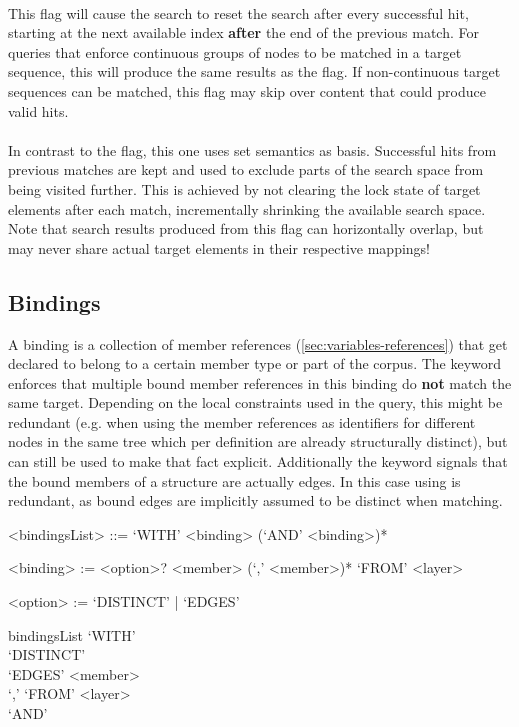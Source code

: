 \documentclass[11pt,a4paper]{report}
\begin{document}
\paragraph{}
This flag will cause the search to reset the search after every successful hit, starting at the next available index \textbf{after} the end of the previous match.
For queries that enforce continuous groups of nodes to be matched in a target sequence, this will produce the same results as the  flag.
If non-continuous target sequences can be matched, this flag may skip over content that could produce valid hits.
\paragraph{}
In contrast to the  flag, this one uses set semantics as basis.
Successful hits from previous matches are kept and used to exclude parts of the search space from being visited further.
This is achieved by not clearing the lock state of target elements after each match, incrementally shrinking the available search space.
Note that search results produced from this flag can horizontally overlap, but may never share actual target elements in their respective mappings!

\subsection{Bindings}
\label{sec:bindings}
A binding is a collection of member references (\ref{sec:variables-references}) that get declared to belong to a certain member type or part of the corpus. 
The  keyword enforces that multiple bound member references in this binding do \textbf{not} match the same target. 
Depending on the local constraints used in the query, this might be redundant (e.g. when using the member references as identifiers for different nodes in the same tree which per definition are already structurally distinct), but can still be used to make that fact explicit. 
Additionally the  keyword signals that the bound members of a structure are actually edges.
In this case using  is redundant, as bound edges are implicitly assumed to be distinct when matching.

\begin{gram}[Bindings]
	\label{gram:bindings}
	\begin{grammar}	
		<bindingsList> ::= `WITH' <binding> (`AND' <binding>)* 
		
		<binding> := <option>? <member> (`,' <member>)* `FROM' <layer>
		
		<option> := `DISTINCT' | `EDGES'	
	\end{grammar}
	\diagsep
	\begin{rrdiag*}{bindingsList}
		`WITH' \srp
			\sst \\ `DISTINCT' \\ `EDGES' \est {} \\ `,' \erp `FROM' <layer>
			\\ `AND'
		\erp 
	\end{rrdiag*}
\end{gram}
\end{document}
